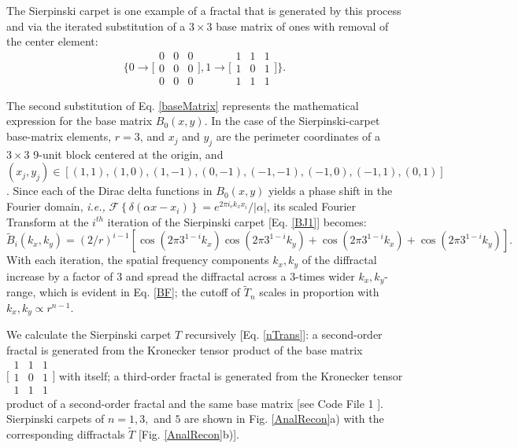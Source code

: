 The Sierpinski carpet is one example of a fractal that is generated by this process and via the iterated substitution of a $3\times 3$ base matrix of ones with removal of the center element:
\begin{equation}
\Bigg\{0\rightarrow \Bigg[\begin{array}{ccc}
0 & 0 & 0 \\
0 & 0 & 0\\
0 & 0 & 0\end{array}\Bigg], 1\rightarrow\Bigg[\begin{array}{ccc}
1 & 1 & 1 \\
1 & 0 & 1\\
1 & 1 & 1\end{array}\Bigg] \Bigg\}.
\label{baseMatrix}
\end{equation}

The second substitution of Eq. \ref{baseMatrix} represents the mathematical expression for the base matrix $B_0(x,y)$.  In the case of the Sierpinski-carpet base-matrix elements, $r=3$, and $x_j$ and $y_j$ are the perimeter coordinates of a $3\times 3$ 9-unit block centered at the origin, and $(x_j,y_j)\in [(1,1),(1,0),(1,-1),(0,-1),(-1,-1),(-1,0),(-1,1),(0,1)]$. Since each of the Dirac delta functions in $B_0(x,y)$ yields a phase shift in the Fourier domain, {\it i.e.,} $\mathscr{F}\left\{\delta(\alpha x-x_i)\right\} = e^{2\pi i_ck_xx_i}/|\alpha|$, its scaled Fourier Transform at the $i^{th}$ iteration of the Sierpinski carpet [Eq. \ref{BJ1}] becomes:
\begin{equation}
\tilde{B}_i(k_x,k_y) = (2/r)^{i-1}[\cos(2\pi3^{1-i}k_x)\cos(2\pi3^{1-i}k_y)+\cos(2\pi 3^{1-i}k_x)+\cos(2\pi 3^{1-i}k_y)].\label{BF}
\end{equation}
With each iteration, the spatial frequency components $k_x,k_y$ of the diffractal increase by a factor of 3 and spread the diffractal across a 3-times wider $k_x,k_y$-range, which is evident in Eq. \ref{BF}; the cutoff of $\tilde{T}_n$ scales in proportion with $k_x, k_y \propto r^{n-1}$. 

We calculate the Sierpinski carpet $T$ recursively [Eq. \ref{nTrans}]: a second-order fractal is generated from the Kronecker tensor product of the base matrix $\Big[\begin{smallmatrix} 1 & 1 & 1 \\ 1 & 0 & 1\\ 1 & 1 & 1\end{smallmatrix}\Big]$ with itself; a third-order fractal is generated from the Kronecker tensor product of a second-order fractal and the same base matrix [see Code File 1 \cite{Code1}]. Sierpinski carpets of $n= 1, 3,$ and $5$ are shown in Fig. \ref{AnalRecon}a) with the corresponding diffractals $\tilde{T}$ [Fig. \ref{AnalRecon}b)]. 

